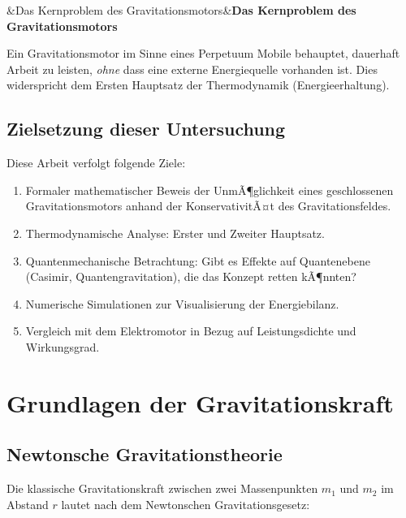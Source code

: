 ﻿\documentclass[12pt, a4paper]{report}
\newenvironment{wichtig}[1][]{%
  \begin{wichtigframe}\sloppy%
  \ifx&#1&\else\textbf{#1}\par\smallskip\fi}{\end{wichtigframe}}
\theoremstyle{definition}
\theoremstyle{remark}
\begin{document}
\begin{wichtig}[Das Kernproblem des Gravitationsmotors]
  Ein Gravitationsmotor im Sinne eines Perpetuum Mobile behauptet, dauerhaft
  Arbeit zu leisten, \emph{ohne} dass eine externe Energiequelle vorhanden ist.
  Dies widerspricht dem Ersten Hauptsatz der Thermodynamik (Energieerhaltung).
\end{wichtig}

\section{Zielsetzung dieser Untersuchung}

Diese Arbeit verfolgt folgende Ziele:
\begin{enumerate}[leftmargin=2em]
  \item Formaler mathematischer Beweis der UnmÃ¶glichkeit eines geschlossenen
        Gravitationsmotors anhand der KonservativitÃ¤t des Gravitationsfeldes.
  \item Thermodynamische Analyse: Erster und Zweiter Hauptsatz.
  \item Quantenmechanische Betrachtung: Gibt es Effekte auf Quantenebene
        (Casimir, Quantengravitation), die das Konzept retten kÃ¶nnten?
  \item Numerische Simulationen zur Visualisierung der Energiebilanz.
  \item Vergleich mit dem Elektromotor in Bezug auf Leistungsdichte und Wirkungsgrad.
\end{enumerate}

\chapter{Grundlagen der Gravitationskraft}
\label{sec:grundlagen}

\section{Newtonsche Gravitationstheorie}

Die klassische Gravitationskraft zwischen zwei Massenpunkten $m_1$ und $m_2$ im
Abstand $r$ lautet nach dem Newtonschen Gravitationsgesetz:
\end{document}
